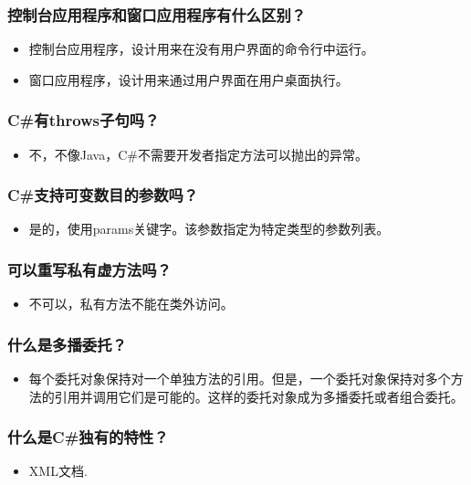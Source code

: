 \documentclass[9pt, b5paper]{article}
\begin{document}
\subsubsection{控制台应用程序和窗口应用程序有什么区别？}
\label{sec-1-2-21}
\begin{itemize}
\item 控制台应用程序，设计用来在没有用户界面的命令行中运行。
\item 窗口应用程序，设计用来通过用户界面在用户桌面执行。
\end{itemize}
\subsubsection{C\#有throws子句吗？}
\label{sec-1-2-22}
\begin{itemize}
\item 不，不像Java，C\#不需要开发者指定方法可以抛出的异常。
\end{itemize}
\subsubsection{C\#支持可变数目的参数吗？}
\label{sec-1-2-23}
\begin{itemize}
\item 是的，使用params关键字。该参数指定为特定类型的参数列表。
\end{itemize}
\subsubsection{可以重写私有虚方法吗？}
\label{sec-1-2-24}
\begin{itemize}
\item 不可以，私有方法不能在类外访问。
\end{itemize}
\subsubsection{什么是多播委托？}
\label{sec-1-2-25}
\begin{itemize}
\item 每个委托对象保持对一个单独方法的引用。但是，一个委托对象保持对多个方法的引用并调用它们是可能的。这样的委托对象成为多播委托或者组合委托。
\end{itemize}
\subsubsection{什么是C\#独有的特性？}
\label{sec-1-2-26}
\begin{itemize}
\item XML文档.
\end{itemize}
\end{document}
